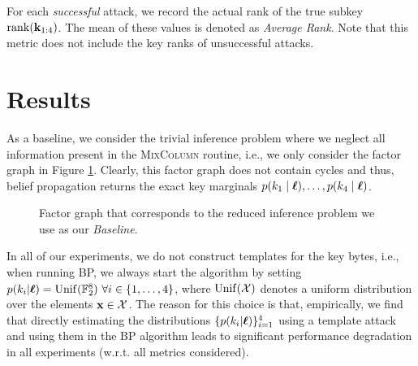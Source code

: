 \begin{definition}
    For each \emph{successful} attack, we record the actual rank of the true subkey $\operatorname{rank}(\mathbf{k}_{1:4})$. The mean of these values is denoted as \emph{Average Rank}. Note that this metric does not include the key ranks of unsuccessful attacks.
\end{definition}

\section{Results}
\label{sec:results}

As a baseline, we consider the trivial inference problem where we neglect all information present in the \textsc{MixColumn} routine, i.e., we only consider the factor graph in Figure \ref{fig:baseline_fg}. Clearly, this factor graph does not contain cycles and thus, belief propagation returns the exact key marginals $p(k_1 \mid \boldsymbol{\ell}),\dots,p(k_4 \mid \boldsymbol{\ell})$. 

\begin{figure}[ht]
    \centering
    
    \caption{Factor graph that corresponds to the reduced inference problem we use as our \emph{Baseline}.}
    \label{fig:baseline_fg}
\end{figure}

In all of our experiments, we do not construct templates for the key bytes, i.e., when running BP, we always start the algorithm by setting $p(k_i | \leak) = \unif(\mathbb{F}_2^8) \ \forall i \in \{1,\dots,4\}$, where $\operatorname{Unif}(\mathcal{X})$ denotes a uniform distribution over the elements $\mathbf{x} \in \mathcal{X}$. The reason for this choice is that, empirically, we find that directly estimating the distributions $\{ p(k_i | \boldsymbol{\ell}) \}_{i=1}^4$ using a template attack and using them in the BP algorithm leads to significant performance degradation in all experiments (w.r.t. all metrics considered).

